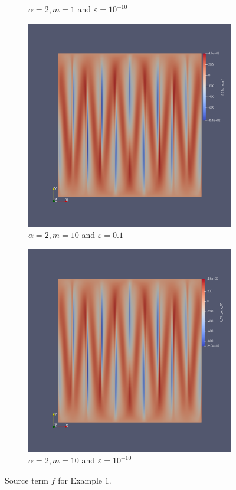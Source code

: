 \documentclass[12pt]{ociamthesis}
\begin{document}
\begin{figure}[H]
\begin{subfigure}{0.44\textwidth}
     \caption{$\alpha=2, m=1$ and $\varepsilon = 10^{-10}$}
 \end{subfigure}
 \begin{subfigure}{0.44\textwidth}
     \includegraphics[width=\textwidth]{Pics/uf/F_E1c_eps_1.png}
     \caption{$\alpha=2, m=10$ and $\varepsilon = 0.1$}
 \end{subfigure}
 \hfill
 \begin{subfigure}{0.44\textwidth}
     \includegraphics[width=\textwidth]{Pics/uf/f_E1c_eps_10.png}
     \caption{$\alpha=2, m=10$ and $\varepsilon = 10^{-10}$}
 \end{subfigure}
 \caption{Source term $f$ for Example $1$.} \label{E1_fs}
\end{figure}
\end{document}
